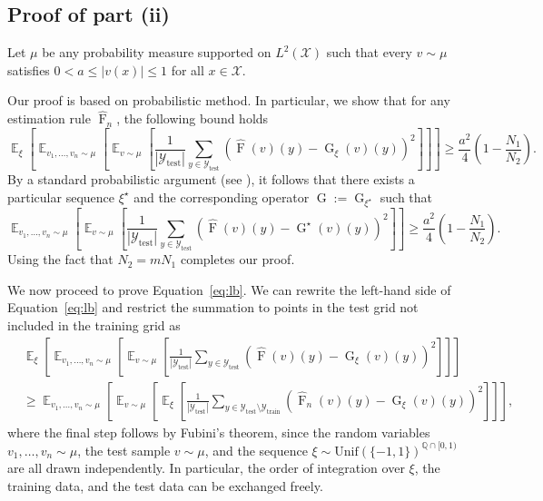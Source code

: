 \documentclass[11pt]{article}
\theoremstyle{plain}
\newcommand{\Xcal}{\mathcal{X}}
\newcommand{\Ycal}{\mathcal{Y}}
\DeclareMathOperator*{\expect}{\mathbb{E}}
\begin{document}
\subsection{Proof of part (ii)}
Let $ \mu $ be any probability measure supported on $ L^2(\mathcal{X}) $ such that every $ v \sim \mu $ satisfies $ 0 < a \leq |v(x)| \leq 1$ for all $x \in \Xcal$. 




Our proof is based on probabilistic method. In particular, we  show that for any estimation rule $ \widehat{\operatorname{F}}_n $, the following bound holds
\begin{equation}\label{eq:lb}
    \expect_{\xi} \left[ \expect_{v_1, \ldots, v_n \sim \mu} \left[ \expect_{v \sim \mu} \left[ 
    \frac{1}{|\Ycal_{\text{test}}|} \sum_{y \in \Ycal_{\text{test}}} \left( \widehat{\operatorname{F}}(v)(y) - \operatorname{G}_{\xi}(v)(y) \right)^2
    \right] \right] \right] 
    \geq \frac{a^2}{4} \left( 1 - \frac{N_1}{N_2} \right).
\end{equation}
By a standard probabilistic argument (see \citet{alon2016probabilistic}), it follows that there exists a particular sequence $ \xi^\star $ and the corresponding operator $ \operatorname{G} := \operatorname{G}_{\xi^\star} $ such that
\[
\expect_{v_1, \ldots, v_n \sim \mu} \left[ \expect_{v \sim \mu} \left[ 
   \frac{1}{|\Ycal_{\text{test}}|} \sum_{y \in \Ycal_{\text{test}}} \left( \widehat{\operatorname{F}}(v)(y) - \operatorname{G}^{\star}(v)(y) \right)^2 
\right] \right] 
\geq \frac{a^2}{4} \left( 1 - \frac{N_1}{N_2} \right).
\]
Using the fact that $N_2=mN_1$ completes our proof.


We now proceed to prove Equation~\eqref{eq:lb}. We can rewrite the left-hand side of Equation~\eqref{eq:lb} and restrict the summation to points in the test grid not included in the training grid as
\begin{equation*}
\begin{split}
&\expect_{\xi} \left[ \expect_{v_1, \ldots, v_n \sim \mu} \left[ \expect_{v \sim \mu} \left[ 
    \frac{1}{|\Ycal_{\text{test}}|} \sum_{y \in \Ycal_{\text{test}}} \left( \widehat{\operatorname{F}}(v)(y) - \operatorname{G}_{\xi}(v)(y) \right)^2
    \right] \right] \right] \\
&\geq \expect_{v_1, \ldots, v_n \sim \mu} \left[ \expect_{v \sim \mu} \left[ \expect_{\xi} \left[
 \frac{1}{|\Ycal_{\text{test}}|} \sum_{y \in \mathcal{Y}_{\text{test}} \setminus \mathcal{Y}_{\text{train}}} 
\left( \widehat{\operatorname{F}}_n(v)(y) - \operatorname{G}_{\xi}(v)(y) \right)^2 
\right] \right] \right],
\end{split}
\end{equation*}
where the final step follows by Fubini's theorem, since the random variables $ v_1, \ldots, v_n \sim \mu $, the test sample $ v \sim \mu $, and the sequence $ \xi \sim \mathrm{Unif}(\{-1,1\})^{\mathbb{Q} \cap [0,1)} $ are all drawn independently. In particular, the order of integration over $ \xi $, the training data, and the test data can be exchanged freely.
\end{document}
